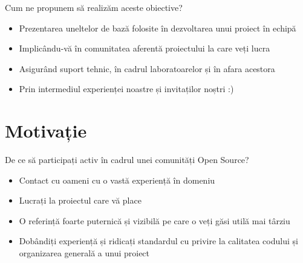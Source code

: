 \documentclass{beamer}
\begin{document}
\begin{frame}{Cum ne propunem să realizăm aceste obiective?}
  \begin{itemize} %
  \pause
  \item Prezentarea uneltelor de bază folosite în dezvoltarea unui proiect în echipă
  \pause
  \item Implicându-vă în comunitatea aferentă proiectului la care veți lucra 
  \pause
  \item Asigurând suport tehnic, în cadrul laboratoarelor și în afara acestora
  \pause
  \item Prin intermediul experienței noastre și invitaților noștri :)
  \end{itemize}
\end{frame}

\section{Motivație}

\begin{frame}{De ce să participați activ în cadrul unei comunități Open Source?}
  \begin{itemize} %
  \pause
  \item Contact cu oameni cu o vastă experiență în domeniu 
  \pause
  \item Lucrați la proiectul care vă place 
  \pause
  \item O referință foarte puternică și vizibilă pe care o veți găsi utilă mai târziu
  \pause
  \item Dobândiți experiență și ridicați standardul cu privire la calitatea codului și organizarea generală a unui proiect
  \end{itemize}
\end{frame}
\end{document}
